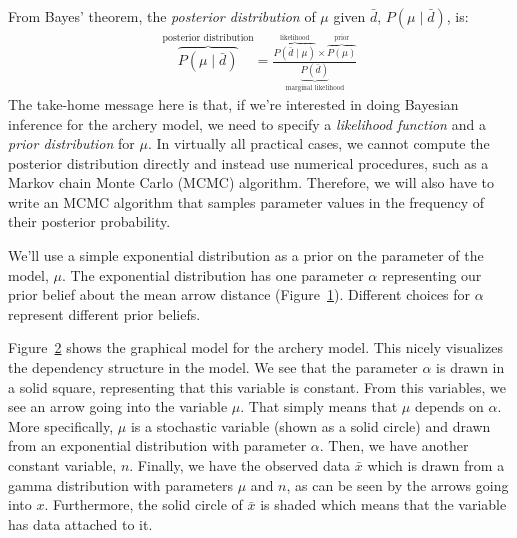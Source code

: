 From Bayes' theorem, the \emph{posterior distribution} of $\mu$ given $\bar d$, $P(\mu \mid \bar d)$, is:
\begin{align*}
\overbrace{P(\mu \mid \bar d)}^{\text{posterior distribution}} = \frac{ \overbrace{P(\bar d \mid \mu)}^{\text{likelihood}} \times \overbrace{P(\mu)}^{\text{prior}}}{\underbrace{P(\bar d)}_{\text{marginal likelihood}}}
\end{align*}
The take-home message here is that, if we're interested in doing Bayesian inference for the archery model, we need to specify a \emph{likelihood function} and a \emph{prior distribution} for $\mu$.
In virtually all practical cases, we cannot compute the posterior distribution directly and instead use numerical procedures, such as a Markov chain Monte Carlo (MCMC) algorithm.
Therefore, we will also have to write an MCMC algorithm that samples parameter values in the frequency of their posterior probability.

We'll use a simple exponential distribution as a prior on the parameter of the model, $\mu$.
The exponential distribution has one parameter $\alpha$ representing our prior belief about the mean arrow distance (Figure~\ref{fig:exponential_distribution}).
Different choices for $\alpha$ represent different prior beliefs.
\begin{figure}[h!]
\centering 
{}
\label{fig:exponential_distribution}
\end{figure}

Figure~\ref{fig:archery_model} shows the graphical model for the archery model.
This nicely visualizes the dependency structure in the model.
We see that the parameter $\alpha$ is drawn in a solid square, representing that this variable is constant.
From this variables, we see an arrow going into the variable $\mu$.
That simply means that $\mu$ depends on $\alpha$.
More specifically, $\mu$ is a stochastic variable (shown as a solid circle) and drawn from an exponential distribution with parameter $\alpha$.
Then, we have another constant variable, $n$.
Finally, we have the observed data $\bar x$ which is drawn from a gamma distribution with parameters $\mu$ and $n$, as can be seen by the arrows going into $x$.
Furthermore, the solid circle of $\bar x$ is shaded which means that the variable has data attached to it.
\begin{figure}[h!]
\centering
{}
\label{fig:archery_model}
\end{figure}




